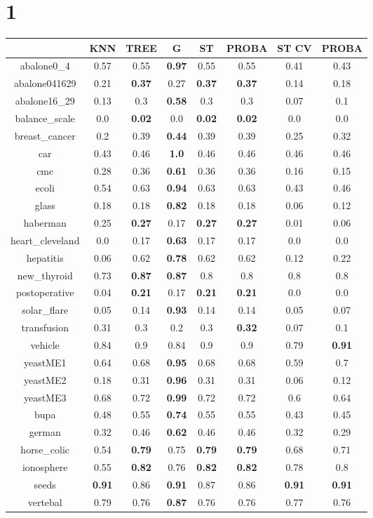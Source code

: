\documentclass{article}%
\begin{document}
%
\section*{1}%
\begin{tabular}{c|ccccccc}%
\hline%
&KNN&TREE&G&ST&PROBA&ST CV&PROBA\\%
\hline%
abalone0\_4&0.57&0.55&\textbf{0.97}&0.55&0.55&0.41&0.43\\%
\hline%
abalone041629&0.21&\textbf{0.37}&0.27&\textbf{0.37}&\textbf{0.37}&0.14&0.18\\%
\hline%
abalone16\_29&0.13&0.3&\textbf{0.58}&0.3&0.3&0.07&0.1\\%
\hline%
balance\_scale&0.0&\textbf{0.02}&0.0&\textbf{0.02}&\textbf{0.02}&0.0&0.0\\%
\hline%
breast\_cancer&0.2&0.39&\textbf{0.44}&0.39&0.39&0.25&0.32\\%
\hline%
car&0.43&0.46&\textbf{1.0}&0.46&0.46&0.46&0.46\\%
\hline%
cmc&0.28&0.36&\textbf{0.61}&0.36&0.36&0.16&0.15\\%
\hline%
ecoli&0.54&0.63&\textbf{0.94}&0.63&0.63&0.43&0.46\\%
\hline%
glass&0.18&0.18&\textbf{0.82}&0.18&0.18&0.06&0.12\\%
\hline%
haberman&0.25&\textbf{0.27}&0.17&\textbf{0.27}&\textbf{0.27}&0.01&0.06\\%
\hline%
heart\_cleveland&0.0&0.17&\textbf{0.63}&0.17&0.17&0.0&0.0\\%
\hline%
hepatitis&0.06&0.62&\textbf{0.78}&0.62&0.62&0.12&0.22\\%
\hline%
new\_thyroid&0.73&\textbf{0.87}&\textbf{0.87}&0.8&0.8&0.8&0.8\\%
\hline%
postoperative&0.04&\textbf{0.21}&0.17&\textbf{0.21}&\textbf{0.21}&0.0&0.0\\%
\hline%
solar\_flare&0.05&0.14&\textbf{0.93}&0.14&0.14&0.05&0.07\\%
\hline%
transfusion&0.31&0.3&0.2&0.3&\textbf{0.32}&0.07&0.1\\%
\hline%
vehicle&0.84&0.9&0.84&0.9&0.9&0.79&\textbf{0.91}\\%
\hline%
yeastME1&0.64&0.68&\textbf{0.95}&0.68&0.68&0.59&0.7\\%
\hline%
yeastME2&0.18&0.31&\textbf{0.96}&0.31&0.31&0.06&0.12\\%
\hline%
yeastME3&0.68&0.72&\textbf{0.99}&0.72&0.72&0.6&0.64\\%
\hline%
bupa&0.48&0.55&\textbf{0.74}&0.55&0.55&0.43&0.45\\%
\hline%
german&0.32&0.46&\textbf{0.62}&0.46&0.46&0.32&0.29\\%
\hline%
horse\_colic&0.54&\textbf{0.79}&0.75&\textbf{0.79}&\textbf{0.79}&0.68&0.71\\%
\hline%
ionosphere&0.55&\textbf{0.82}&0.76&\textbf{0.82}&\textbf{0.82}&0.78&0.8\\%
\hline%
seeds&\textbf{0.91}&0.86&\textbf{0.91}&0.87&0.86&\textbf{0.91}&\textbf{0.91}\\%
\hline%
vertebal&0.79&0.76&\textbf{0.87}&0.76&0.76&0.77&0.76\\%
\hline%
\end{tabular}
\end{document}
